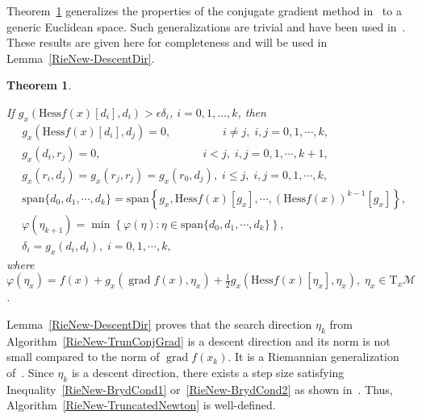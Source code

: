 \documentclass[11pt]{article}
\newcommand{\whcomm}[2]{{\sf\color{purple} #1}{\sf\color{blue} #2}}
\newtheorem{theorem}{Theorem}[section]
\numberwithin{equation}{section}
\DeclareMathOperator{\grad}{\mathrm{grad}}
\begin{document}
Theorem~\ref{App-Theorem1} generalizes the properties of the conjugate gradient method in~\cite{Hestenes1952MethodsOC} to a generic Euclidean space. Such generalizations are trivial and have been used in~\cite{AbsMahSep2008}. These results are given here for completeness and will be used in Lemma~\ref{RieNew-DescentDir}.

\begin{theorem} \label{App-Theorem1}


  If $g_x(\mathrm{Hess}f(x)[d_i], d_i)>\epsilon \delta_i$, $i=0,1,\dots,k$, then
\begin{align}
      & g_x( \mathrm{Hess}f(x)[d_i],d_j ) = 0,\quad\quad\quad\quad\;\; i\not=j,\;i,j=0,1,\cdots,k, \label{App-Theorem1-1} \\ 
      & g_x( d_i, r_j )=0,\quad\quad\quad\quad\quad\quad\quad\quad\quad i<j,\;i,j=0,1,\cdots,k+1, \label{App-Theorem1-2} \\ 
      & g_x( r_i, d_j ) = g_x(r_j, r_j) = g_x(r_0, d_j),\; i\le j,\; i,j=0,1,\cdots,k, \label{App-Theorem1-3} \\ 
      & \mathrm{span}\{ d_0,d_1,\cdots,d_k \} = \mathrm{span}\left\{g_x,\mathrm{Hess}f(x)[g_x],\cdots,(\mathrm{Hess}f(x))^{k-1}[g_x]\right\}, \label{App-Theorem1-4}\\ 
      & \varphi(\eta_{k+1}) = \min \left\{ \varphi(\eta): \eta\in \mathrm{span}\{d_0,d_1,\cdots,d_k\} \right\}, \label{App-Theorem1-5} \\ 
      & \delta_i = g_x(d_i,d_i),\;i=0,1,\cdots,k, \label{App-Theorem1-6}
\end{align}
where $\varphi(\eta_x) = f(x) + g_x(\grad f(x),\eta_x) + \frac{1}{2} g_x(\mathrm{Hess}f(x)[\eta_x],\eta_x),\;\eta_x\in \mathrm{T}_x\mathcal{M}$.
\end{theorem}

Lemma~\ref{RieNew-DescentDir} proves that the search direction $\eta_k$ from Algorithm~\ref{RieNew-TrunConjGrad} is a descent direction and its norm is not small compared to the norm of $\grad f(x_k)$. It is a Riemannian generalization of~\cite[Lemma~A.2]{dembo_truncated-newton_1983}.
Since $\eta_k$ is a descent direction, there exists a step size satisfying Inequality~\eqref{RieNew-BrydCond1} or~\eqref{RieNew-BrydCond2} as shown in~\cite{NW06, huang_riemannian_2018}. Thus, Algorithm~\ref{RieNew-TruncatedNewton} is well-defined.
\end{document}
